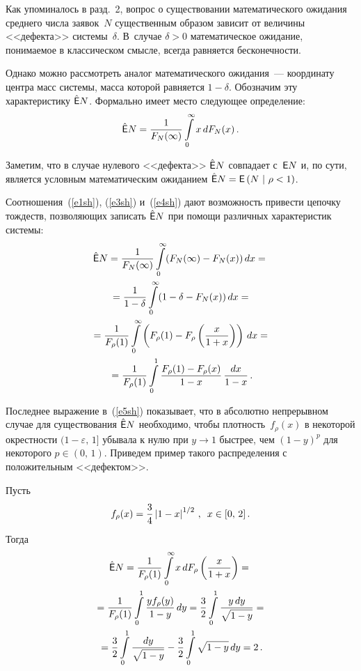 \begin{multicols}{2}

Как упоминалось в разд.~2, вопрос о существовании математического ожидания среднего числа заявок~$N$ существенным
образом зависит от величины <<дефекта>> системы~$\delta$. В~случае $\delta>0$ математическое ожидание, понимаемое в
классическом смысле, всегда равняется бесконечности.

Однако можно рассмотреть аналог математического ожидания~--- координату центра масс системы, масса которой равняется
$1-\delta$. Обозначим эту характеристику $\hat{\sf E}N$. Формально имеет место следующее определение:
$$
\hat{\sf E} N=\displaystyle\frac{\displaystyle 1\mathstrut}{\displaystyle F_N(\infty)\mathstrut}\int\limits_{0}^{\infty}x\, dF_N(x)\,.
$$

Заметим, что в случае нулевого <<дефекта>> $\hat{\sf E}N$ совпадает с~${\sf E} N$ и, по сути, является условным
математическим ожиданием $\hat{\sf E}N={\sf E}\left(N\ |\ \rho<1\right)$.

Соотношения~(\ref{e1sh}), (\ref{e3sh}) и~(\ref{e4sh}) 
дают возможность привести цепочку тождеств, позволяющих записать $\hat{\sf E}N$ при
помощи различных характеристик системы:
\begin{multline}
\hat{\sf E}N=\fr{1}{F_N(\infty)}\il{0}{\infty}(F_N(\infty)-F_N(x))\, dx={}\\
{}=\fr{1}{1-\delta}\il{0}{\infty}(1-\delta-F_N(x))\, dx={}\\
{}=\fr{1}{F_\rho(1)}\il{0}{\infty}\left(F_\rho(1)-F_\rho\left(\fr{x}{1+x}\right)\right)\, dx={}\\
{}
=\fr{1}{F_\rho(1)}\il{0}{1} \fr{F_\rho(1)-F_\rho(x)}{1-x}\, \fr{dx}{1-x}\,.
\label{e5sh}
\end{multline}

Последнее выражение в~(\ref{e5sh}) показывает, что в абсолютно непрерывном случае для существования $\hat{\sf E}N$
необходимо, чтобы плотность~$f_\rho(x)$ в некоторой окрестности $(1-\varepsilon,\,1]$ убывала к нулю при $y\to 1$
быстрее, чем $(1-y)^p$ для некоторого $p\in(0,\,1)$.
Приведем пример такого распределения с положительным <<дефектом>>.

Пусть
$$
f_\rho(x)=\displaystyle\frac{\displaystyle 3\mathstrut}{\displaystyle 4\mathstrut}\left\vert1-x\right\vert^{{1}/{2}}\,,\enskip x\in[0,\,2]\,.
$$
Тогда
\begin{multline*}
\hat{\sf E}N=\displaystyle\frac{\displaystyle 1\mathstrut}{\displaystyle F_\rho(1)\mathstrut}\int\limits_{0}^{\infty}x\, dF_\rho\left(\displaystyle\frac{\displaystyle x\mathstrut}{\displaystyle 1+x\mathstrut}\right)
={}\\
{}=\displaystyle\frac{\displaystyle 1\mathstrut}{\displaystyle F_\rho(1)\mathstrut}\int\limits_{0}^{1}\displaystyle\frac{\displaystyle yf_\rho(y)\mathstrut}{\displaystyle 1-y\mathstrut}\,dy=
\displaystyle\frac{\displaystyle 3\mathstrut}{\displaystyle 2\mathstrut}\int\limits_{0}^{1}\displaystyle\frac{\displaystyle y\,dy\mathstrut}{\displaystyle \sqrt{1-y}\mathstrut}={}\\
{}=\displaystyle\frac{\displaystyle 3\mathstrut}{\displaystyle 2\mathstrut}\int\limits_{0}^{1}\displaystyle\frac{\displaystyle dy\mathstrut}{\displaystyle \sqrt{1-y}\mathstrut}-
\displaystyle\frac{\displaystyle 3\mathstrut}{\displaystyle 2\mathstrut}\int\limits_{0}^{1}\sqrt{1-y}\,dy=2\,.
\end{multline*}


\end{multicols}

